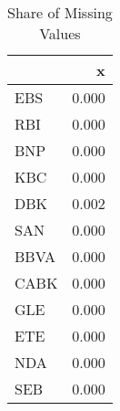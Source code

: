 \begin{table}

\caption{Share of Missing Values}
\centering
\begin{tabular}[t]{lr}
\toprule
  & x\\
\midrule
EBS & 0.000\\
RBI & 0.000\\
BNP & 0.000\\
KBC & 0.000\\
DBK & 0.002\\
\addlinespace
SAN & 0.000\\
BBVA & 0.000\\
CABK & 0.000\\
GLE & 0.000\\
ETE & 0.000\\
\addlinespace
NDA & 0.000\\
SEB & 0.000\\
\bottomrule
\end{tabular}
\end{table}

